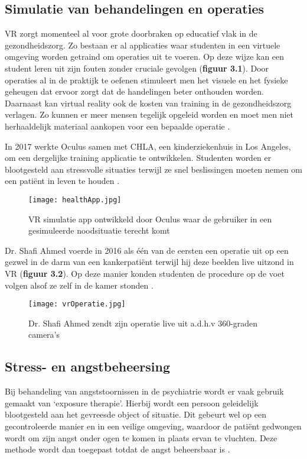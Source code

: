 \subsection{Simulatie van behandelingen en operaties}
VR zorgt momenteel al voor grote doorbraken op educatief vlak in de gezondheidszorg. Zo bestaan er al applicaties waar studenten in een virtuele omgeving worden getraind om operaties uit te voeren. Op deze wijze kan een student leren uit zijn fouten zonder cruciale gevolgen (\textbf{figuur 3.1}). Door operaties al in de praktijk te oefenen stimuleert men het visuele en het fysieke geheugen dat ervoor zorgt dat de handelingen beter onthouden worden. Daarnaast kan virtual reality ook de kosten van training in de gezondheidszorg verlagen. Zo kunnen er meer mensen tegelijk opgeleid worden en moet men niet herhaaldelijk materiaal aankopen voor een bepaalde operatie \autocite{Elion2018}.

In 2017 werkte Oculus samen met CHLA, een kinderziekenhuis in Los Angeles, om een dergelijke training applicatie te ontwikkelen. Studenten worden er blootgesteld aan stressvolle situaties terwijl ze snel beslissingen moeten nemen om een patiënt in leven te houden \autocite{Adobe2018}.

\begin{figure}[h]
    \centering
    \texttt{[image: healthApp.jpg]}
    \caption{VR simulatie app ontwikkeld door Oculus waar de gebruiker in een gesimuleerde noodsituatie terecht komt \autocite{Adobe2018}}
\end{figure}

Dr. Shafi Ahmed voerde in 2016  als één van de eersten een operatie uit op een gezwel in de darm van een kankerpatiënt terwijl hij deze beelden live uitzond in VR (\textbf{figuur 3.2}). Op deze manier konden studenten de procedure op de voet volgen alsof ze zelf in de kamer stonden \autocite{Pelta2017}.

\begin{figure}[h]
    \centering
    \texttt{[image: vrOperatie.jpg]}
    \caption{Dr. Shafi Ahmed zendt zijn operatie live uit a.d.h.v 360-graden camera's \autocite{Realities2019}}
\end{figure}

\subsection{Stress- en angstbeheersing}  
Bij behandeling van angststoornissen in de psychiatrie wordt er vaak gebruik gemaakt van ‘exposure therapie’. Hierbij wordt een persoon geleidelijk blootgesteld aan het gevreesde object of situatie. Dit gebeurt wel op een gecontroleerde manier en in een veilige omgeving, waardoor de patiënt gedwongen wordt om zijn angst onder ogen te komen in plaats ervan te vluchten. Deze methode wordt dan toegepast totdat de angst beheersbaar is \autocite{Keller2018}. 


